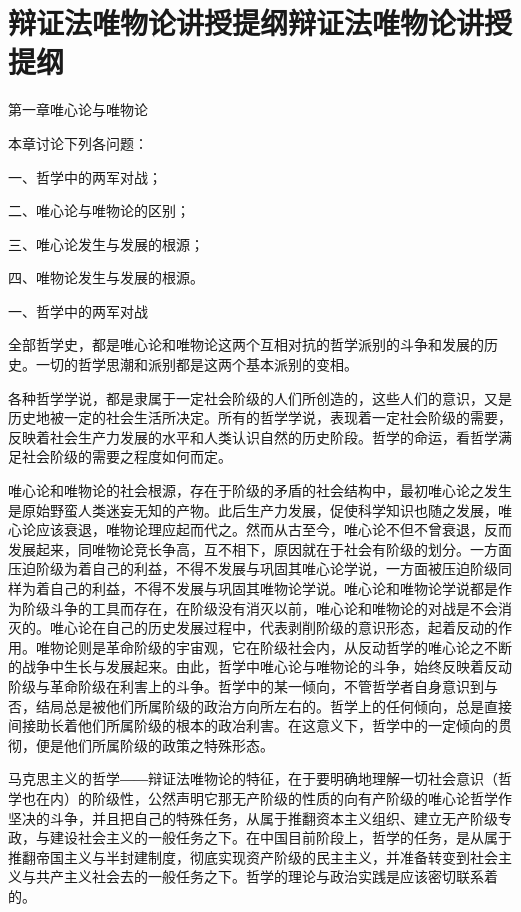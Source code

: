 \section[辩证法唯物论讲授提纲辩证法唯物论讲授提纲]{辩证法唯物论讲授提纲辩证法唯物论讲授提纲}


第一章唯心论与唯物论

本章讨论下列各问题：

一、哲学中的两军对战；

二、唯心论与唯物论的区别；

三、唯心论发生与发展的根源；

四、唯物论发生与发展的根源。

一、哲学中的两军对战

全部哲学史，都是唯心论和唯物论这两个互相对抗的哲学派别的斗争和发展的历史。一切的哲学思潮和派别都是这两个基本派别的变相。

各种哲学学说，都是隶属于一定社会阶级的人们所创造的，这些人们的意识，又是历史地被一定的社会生活所决定。所有的哲学学说，表现着一定社会阶级的需要，反映着社会生产力发展的水平和人类认识自然的历史阶段。哲学的命运，看哲学满足社会阶级的需要之程度如何而定。

唯心论和唯物论的社会根源，存在于阶级的矛盾的社会结构中，最初唯心论之发生是原始野蛮人类迷妄无知的产物。此后生产力发展，促使科学知识也随之发展，唯心论应该衰退，唯物论理应起而代之。然而从古至今，唯心论不但不曾衰退，反而发展起来，同唯物论竞长争高，互不相下，原因就在于社会有阶级的划分。一方面压迫阶级为着自己的利益，不得不发展与巩固其唯心论学说，一方面被压迫阶级同样为着自己的利益，不得不发展与巩固其唯物论学说。唯心论和唯物论学说都是作为阶级斗争的工具而存在，在阶级没有消灭以前，唯心论和唯物论的对战是不会消灭的。唯心论在自己的历史发展过程中，代表剥削阶级的意识形态，起着反动的作用。唯物论则是革命阶级的宇宙观，它在阶级社会内，从反动哲学的唯心论之不断的战争中生长与发展起来。由此，哲学中唯心论与唯物论的斗争，始终反映着反动阶级与革命阶级在利害上的斗争。哲学中的某一倾向，不管哲学者自身意识到与否，结局总是被他们所属阶级的政治方向所左右的。哲学上的任何倾向，总是直接间接助长着他们所属阶级的根本的政冶利害。在这意义下，哲学中的一定倾向的贯彻，便是他们所属阶级的政策之特殊形态。

马克思主义的哲学――辩证法唯物论的特征，在于要明确地理解一切社会意识（哲学也在内）的阶级性，公然声明它那无产阶级的性质的向有产阶级的唯心论哲学作坚决的斗争，并且把自己的特殊任务，从属于推翻资本主义组织、建立无产阶级专政，与建设社会主义的一般任务之下。在中国目前阶段上，哲学的任务，是从属于推翻帝国主义与半封建制度，彻底实现资产阶级的民主主义，并准备转变到社会主义与共产主义社会去的一般任务之下。哲学的理论与政治实践是应该密切联系着的。

